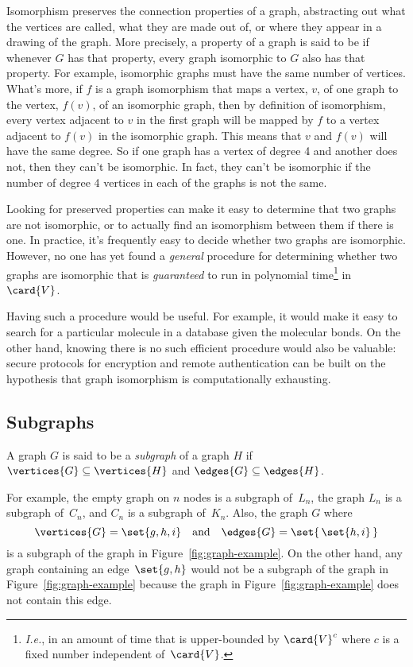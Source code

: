 Isomorphism preserves the connection properties of a graph,
abstracting out what the vertices are called, what they are made out
of, or where they appear in a drawing of the graph.  More precisely, a
property of a graph is said to be 
if whenever $G$ has that property, every graph isomorphic to $G$ also
has that property.  For example, isomorphic graphs must have the same
number of vertices.  What's more, if $f$ is a graph isomorphism that
maps a vertex, $v$, of one graph to the vertex, $f(v)$, of an
isomorphic graph, then by definition of isomorphism, every vertex
adjacent to $v$ in the first graph will be mapped by $f$ to a vertex
adjacent to $f(v)$ in the isomorphic graph.  This means that $v$ and
$f(v)$ will have the same degree.  So if one graph has a vertex of
degree 4 and another does not, then they can't be isomorphic.  In
fact, they can't be isomorphic if the number of degree 4 vertices in
each of the graphs is not the same.

Looking for preserved properties can make it easy to determine that
two graphs are not isomorphic, or to actually find an isomorphism
between them if there is one.  In practice, it's frequently easy to
decide whether two graphs are isomorphic.  However, no one has yet
found a
\emph{general} procedure for determining whether two graphs are isomorphic
that is \emph{guaranteed} to run in polynomial
time\footnote{\emph{I.e.}, in an amount of time that is upper-bounded
  by $\card{V}^c$ where $c$ is a fixed number independent of~$\card{V}$.}
in~$\card{V}$.

Having such a procedure would be useful.  For example, it would make
it easy to search for a particular molecule in a database given the
molecular bonds.  On the other hand, knowing there is no such
efficient procedure would also be valuable: secure protocols for
encryption and remote authentication can be built on the hypothesis
that graph isomorphism is computationally exhausting.

\subsection{Subgraphs}

\begin{definition}\label{def:subgraph}
  A graph $G$ is said to be a \emph{subgraph} of a graph $H$ if
  $\vertices{G} \subseteq \vertices{H}$ and $\edges{G} \subseteq
  \edges{H}$.
\end{definition}

For example, the empty graph on $n$ nodes is a subgraph of~$L_n$,
the graph $L_n$ is a subgraph of~$C_n$, and $C_n$ is a subgraph of~$K_n$.
Also, the graph $G$ where
\begin{equation*}
   \vertices{G} = \set{ g, h, i } \quad \text{and}\quad  \edges{G} =
   \set{\, \set{h, i} \, }
\end{equation*}
is a subgraph of the graph in Figure~\ref{fig:graph-example}.  On the
other hand, any graph containing an edge~$\set{g, h}$ would not be a
subgraph of the graph in Figure~\ref{fig:graph-example} because the
graph in Figure~\ref{fig:graph-example} does not contain this edge.


